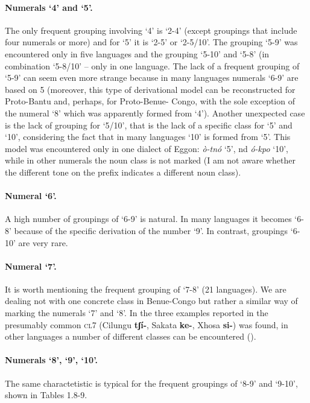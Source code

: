 \paragraph*{Numerals ‘4’ and ‘5’.} The only frequent grouping involving ‘4’ is ‘2-4’ (except groupings that include four numerals or more) and for ‘5’ it is ‘2-5’ or ‘2-5/10’. The grouping ‘5-9’ was encountered only in five languages and the grouping ‘5-10’ and ‘5-8’ (in combination ‘5-8/10’ – only in one language. The lack of a frequent grouping of ‘5-9’ can seem even more strange because in many languages numerals ‘6-9’ are based on 5 (moreover, this type of derivational model can be reconstructed for Proto-Bantu and, perhaps, for Proto-Benue- Congo, with the sole exception of the numeral ‘8’ which was apparently formed from ‘4’). Another unexpected case is the lack of grouping for ‘5/10’, that is the lack of a specific class for ‘5’ and ‘10’, considering the fact that in many languages ‘10’ is formed from ‘5’. This model was encountered only in one dialect of Eggon: \textit{{\`{o}}-tn{\'{o}}} ‘5’, nd \textit{{\'{o}}-kpo} ‘10’, while in other numerals the noun class is not marked (I am not aware whether the different tone on the prefix indicates a different noun class). 

\paragraph*{Numeral ‘6’.} A high number of groupings of ‘6-9’ is natural. In many languages it becomes ‘6-8’ because of the specific derivation of the number ‘9’. In contrast, groupings ‘6-10’ are very rare. 

\paragraph*{Numeral ‘7’.} It is worth mentioning the frequent grouping of ‘7-8’ (21 languages). We are dealing not with one concrete class in Benue-Congo but rather a similar way of marking the numerals ‘7’ and ‘8’. In the three examples reported in  the presumably common \textsc{cl}7 (Cilungu \textbf{tʃí-}, Sakata \textbf{ke-}, Xhosa \textbf{si-}) was found, in other languages a number of different classes can be encountered (). 

\paragraph*{Numerals ‘8’, ‘9’, ‘10’.} The same charactetistic is typical for the frequent groupings of ‘8-9’ and ‘9-10’, shown in Tables 1.8-9. 


